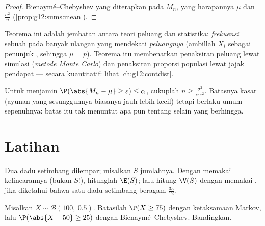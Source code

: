 \begin{proof}
Bienaymé--Chebyshev yang diterapkan pada $M_n$, yang harapannya $\mu$ dan
 $\frac{\sigma^2}{n}$ (\cref{prop:g12:sums:mean}).
\end{proof}

\begin{remark}
Teorema ini adalah jembatan antara teori peluang dan statistika:
\emph{frekuensi} sebuah  pada banyak ulangan yang  mendekati
\emph{peluangnya} (ambillah $X_i$ sebagai penunjuk , sehingga
$\mu = p$). Teorema itu membenarkan penaksiran peluang lewat simulasi
(\emph{metode Monte Carlo}) dan penaksiran proporsi populasi lewat jajak pendapat ---
secara kuantitatif: lihat \cref{ch:g12:contdist}.
\end{remark}

\begin{method}\label{met:g12:sums:chebyshev}
Untuk menjamin $\P(\abs{M_n - \mu} \geq \varepsilon) \leq \alpha$,
cukuplah $n \geq \frac{\sigma^2}{\alpha\,\varepsilon^2}$. Batasnya
kasar (ayunan yang sesungguhnya biasanya jauh lebih kecil) tetapi berlaku umum
sepenuhnya: batas itu tak menuntut apa pun tentang  selain  yang berhingga.
\end{method}

\section{Latihan}

\begin{exercise}[$\star$]\label{exo:g12:sums:1}
Dua dadu setimbang dilempar; misalkan $S$ jumlahnya. Dengan memakai kelinearannya (bukan
 $S$!), hitunglah $\E(S)$; lalu hitung $\V(S)$ dengan memakai
, jika diketahui bahwa satu dadu setimbang beragam $\frac{35}{12}$.
\end{exercise}

\begin{exercise}[$\star$]\label{exo:g12:sums:2}
Misalkan $X \sim \mathcal B(100,\ 0.5)$. Batasilah
$\P(X \geq 75)$ dengan ketaksamaan Markov, lalu
$\P(\abs{X - 50} \geq 25)$ dengan Bienaymé--Chebyshev. Bandingkan.
\end{exercise}

